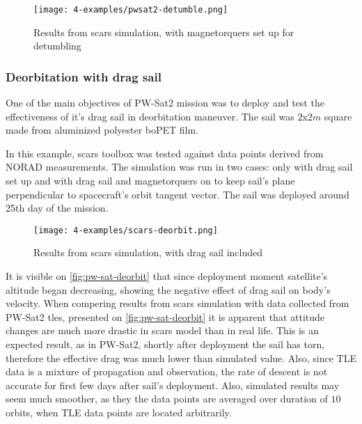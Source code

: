             \begin{figure}[H]
                \centering
                \texttt{[image: 4-examples/pwsat2-detumble.png]}
                \caption{Results from \ac{scars} simulation, with magnetorquers set up for detumbling}
                \label{fig:detumble}
            \end{figure}

        \subsubsection{Deorbitation with drag sail}
            One of the main objectives of PW-Sat2 mission was to deploy and test the effectiveness of it's drag sail in deorbitation maneuver. The sail was  $2$x$2m$ square made from aluminized polyester boPET film\cite{pwsat2dt}.
            
            In this example, \ac{scars} toolbox was tested against data points derived from NORAD measurements. The simulation was run in two cases: only with drag sail set up and with drag sail and magnetorquers on to keep sail's plane perpendicular to spacecraft's orbit tangent vector. The sail was deployed around 25th day of the mission.
                         
            \begin{figure}[H]
                \centering
                \texttt{[image: 4-examples/scars-deorbit.png]}
                \caption{Results from \ac{scars} simulation, with drag sail included}
                \label{fig:scars-deorbit}
            \end{figure}

            It is visible on \autoref{fig:pw-sat-deorbit} that since deployment moment satellite's altitude began decreasing, showing the negative effect of drag sail on body's velocity. When compering results from \ac{scars} simulation with data collected from PW-Sat2 \ac{tle}s, presented on \autoref{fig:pw-sat-deorbit} it is apparent that attitude changes are much more drastic in \ac{scars} model than in real life. This is an expected result, as in PW-Sat2, shortly after deployment the sail has torn, therefore the effective drag was much lower than simulated value\cite{space24_pwsat}. Also, since TLE data is a mixture of propagation and observation, the rate of descent is not accurate for first few days after sail's deployment. Also, simulated results may seem much smoother, as they the data points are averaged over duration of $10$ orbits, when TLE data points are located arbitrarily.
            
